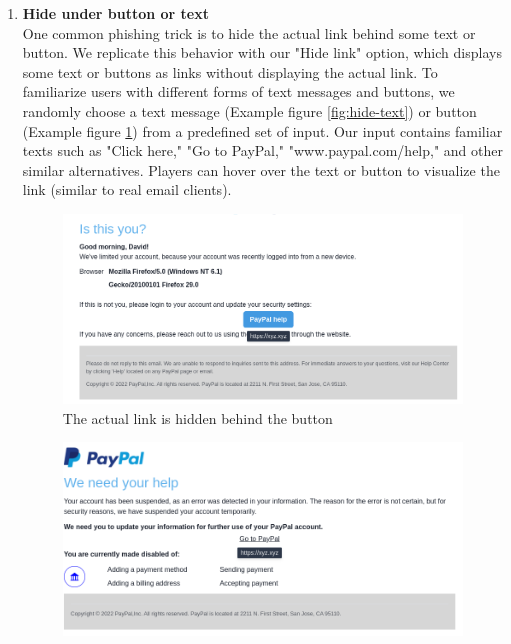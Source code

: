 \begin{enumerate}
    \item \textbf{Hide under button or text}\\
          One common phishing trick is to hide the actual link behind some text or button. We replicate this behavior with our "Hide link" option, which displays some text or buttons as links without displaying the actual link. To familiarize users with different forms of text messages and buttons, we randomly choose a text message (Example figure \ref{fig:hide-text}) or button (Example figure \ref{fig:hide-button}) from a predefined set of input. Our input contains familiar texts such as "Click here," "Go to PayPal," "www.paypal.com/help," and other similar alternatives. Players can hover over the text or button to visualize the link (similar to real email clients).

          \begin{figure}[!ht]
              \centering
              \includegraphics[width=\textwidth]{figures/section2/hide_button.png}
              \caption{The actual link is hidden behind the button}
              \label{fig:hide-button}
          \end{figure}

          \begin{figure}[!ht]{
                  \centering
                  \includegraphics[width=\textwidth]{figures/section2/hide_text.png}

}
\end{figure}
\end{enumerate}

